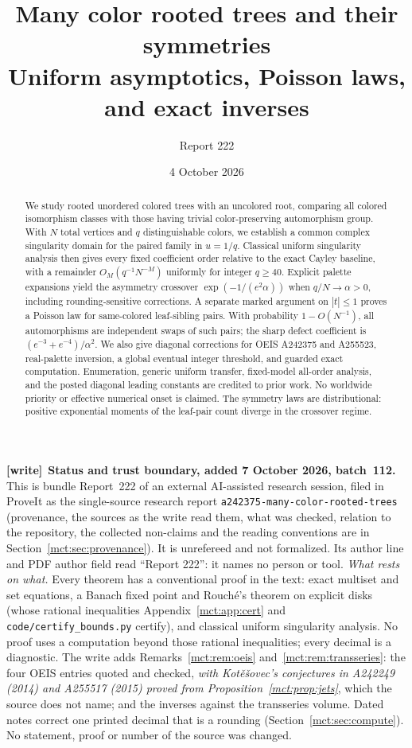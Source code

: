 \documentclass[11pt]{article}
\title{Many color rooted trees and their symmetries\\[5pt]\large Uniform asymptotics, Poisson laws, and exact inverses}
\author{Report 222}
\date{4 October 2026}
\theoremstyle{definition}
\newcommand{\file}[1]{\nolinkurl{#1}}
\newenvironment{writenote}[1][]{\par\smallskip\begingroup\small
 \noindent\textbf{[write]}\if\relax\detokenize{#1}\relax\else~\textbf{#1.}\fi\ }%
 {\par\endgroup\smallskip}
\begin{document}
\maketitle
\begin{abstract}
We study rooted unordered colored trees with an uncolored root, comparing all colored isomorphism classes with those having trivial color-preserving automorphism group. With $N$ total vertices and $q$ distinguishable colors, we establish a common complex singularity domain for the paired family in $u=1/q$. Classical uniform singularity analysis then gives every fixed coefficient order relative to the exact Cayley baseline, with a remainder $O_M(q^{-1}N^{-M})$ uniformly for integer $q\ge40$. Explicit palette expansions yield the asymmetry crossover $\exp(-1/(e^2\alpha))$ when $q/N\to\alpha>0$, including rounding-sensitive corrections. A separate marked argument on $|t|\le1$ proves a Poisson law for same-colored leaf-sibling pairs. With probability $1-O(N^{-1})$, all automorphisms are independent swaps of such pairs; the sharp defect coefficient is $(e^{-3}+e^{-4})/\alpha^2$. We also give diagonal corrections for OEIS A242375 and A255523, real-palette inversion, a global eventual integer threshold, and guarded exact computation. Enumeration, generic uniform transfer, fixed-model all-order analysis, and the posted diagonal leading constants are credited to prior work. No worldwide priority or effective numerical onset is claimed. The symmetry laws are distributional: positive exponential moments of the leaf-pair count diverge in the crossover regime.
\end{abstract}
\begin{writenote}[Status and trust boundary, added 7 October 2026, batch~112]
This is bundle Report~222 of an external AI-assisted research session, filed
in ProveIt as the single-source research report
\file{a242375-many-color-rooted-trees} (provenance, the sources as the write
read them, what was checked, relation to the repository, the collected
non-claims and the reading conventions are in
Section~\ref{mct:sec:provenance}). It is unrefereed and not formalized. Its
author line and PDF author field read ``Report 222'': it names no person or
tool. \emph{What rests on what.} Every theorem has a conventional proof in
the text: exact multiset and set equations, a Banach fixed point and
Rouch\'e's theorem on explicit disks (whose rational inequalities
Appendix~\ref{mct:app:cert} and \file{code/certify_bounds.py} certify), and
classical uniform singularity analysis. No proof uses a computation beyond
those rational inequalities; every decimal is a diagnostic. The write adds
Remarks~\ref{mct:rem:oeis} and~\ref{mct:rem:transseries}: the four OEIS
entries quoted and checked, \emph{with Kot\v{e}\v{s}ovec's conjectures in
A242249 (2014) and A255517 (2015) proved from Proposition~\ref{mct:prop:jets}},
which the source does not name; and the inverses against the transseries
volume. Dated notes correct one printed decimal that is a rounding
(Section~\ref{mct:sec:compute}). No statement, proof or number of the source
was changed.
\end{writenote}
\tableofcontents
\newpage
\end{document}
